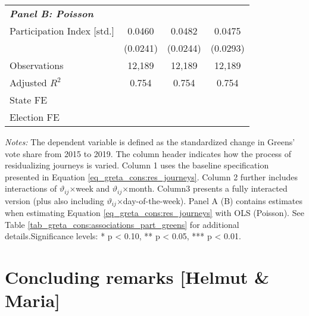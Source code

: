 \begin{table}[H]
\begin{threeparttable}
{\begin{tabular}{l*{3}{c}}
				\multicolumn{4}{l}{\textbf{\textit{Panel B: Poisson}}} \\
				Participation Index [std.]&      0.0460\sym{*}  &      0.0482\sym{**} &      0.0475		  \\
				&    (0.0241)         &    (0.0244)         &    (0.0293)         \\
				Observations      		&      12,189         &      12,189         &      12,189         \\
				Adjusted $R^2$         	&       0.754         &       0.754         &       0.754         \\		
				State FE				& \checkmark 		  & \checkmark       & \checkmark  \\
				Election FE				& \checkmark 		  & \checkmark       & \checkmark  \\
				\bottomrule
		\end{tabular}}
		\begin{tablenotes} 
			\item \scriptsize \emph{Notes:} The dependent variable is defined as the standardized change in Greens' vote share from 2015 to 2019. The column header indicates how the process of residualizing journeys is varied. Column 1 uses the baseline specification presented in Equation \ref{eq_greta_cons:res_journeys}. Column 2 further includes interactions of $\vartheta_{ij}$$\times$week and  $\vartheta_{ij}$$\times$month. Column3 presents a fully interacted version (plus also including $\vartheta_{ij}$$\times$day-of-the-week). Panel A (B) contains estimates when estimating Equation \ref{eq_greta_cons:res_journeys} with OLS (Poisson). See Table \ref{tab_greta_cons:associations_part_greens} for additional details.\newline Significance levels: * p < 0.10, ** p < 0.05, *** p < 0.01.
		\end{tablenotes} 
	\end{threeparttable}
\end{table}


\bigskip
\section{Concluding remarks [Helmut \& Maria]}\label{sec_greta_cons:conclusion}